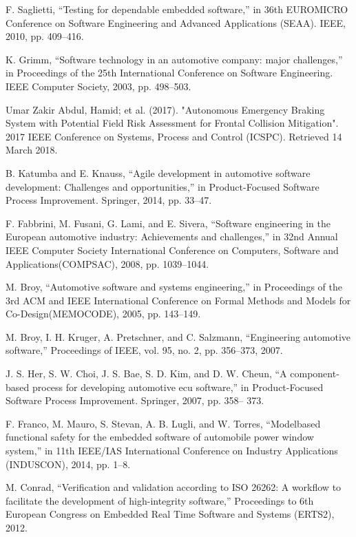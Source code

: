 \documentclass{article}
\begin{document}
\begin{thebibliography}{9}
F. Saglietti, “Testing for dependable embedded software,” in 36th EUROMICRO Conference on Software Engineering and Advanced Applications (SEAA). IEEE, 2010, pp. 409–416.
 
K. Grimm, “Software technology in an automotive company: major challenges,” in Proceedings of the 25th International Conference on Software Engineering. IEEE Computer Society, 2003, pp. 498–503.
 
Umar Zakir Abdul, Hamid; et al. (2017). "Autonomous Emergency Braking System with Potential Field Risk Assessment for Frontal Collision Mitigation". 2017 IEEE Conference on Systems, Process and Control (ICSPC). Retrieved 14 March 2018.

B. Katumba and E. Knauss, “Agile development in automotive software development: Challenges and opportunities,” in Product-Focused Software Process Improvement. Springer, 2014, pp. 33–47. 

F. Fabbrini, M. Fusani, G. Lami, and E. Sivera, “Software engineering in the European automotive industry: Achievements and challenges,” in 32nd Annual IEEE Computer Society International Conference on Computers, Software and Applications(COMPSAC), 2008, pp. 1039–1044.

M. Broy, “Automotive software and systems engineering,” in Proceedings of the 3rd ACM and IEEE International Conference on Formal Methods and Models for Co-Design(MEMOCODE), 2005, pp. 143–149. 

M. Broy, I. H. Kruger, A. Pretschner, and C. Salzmann, “Engineering automotive software,” Proceedings of IEEE, vol. 95, no. 2, pp. 356–373, 2007. 

J. S. Her, S. W. Choi, J. S. Bae, S. D. Kim, and D. W. Cheun, “A component-based process for developing automotive ecu software,” in Product-Focused Software Process Improvement. Springer, 2007, pp. 358– 373.

F. Franco, M. Mauro, S. Stevan, A. B. Lugli, and W. Torres, “Modelbased functional safety for the embedded software of automobile power window system,” in 11th IEEE/IAS International Conference on Industry Applications (INDUSCON), 2014, pp. 1–8. 

M. Conrad, “Veriﬁcation and validation according to ISO 26262: A workﬂow to facilitate the development of high-integrity software,” Proceedings to 6th European Congress on Embedded Real Time Software and Systems (ERTS2), 2012. 


\end{thebibliography}
\end{document}
